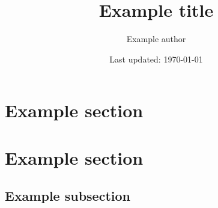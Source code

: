 \documentclass[lang=english]{math-handout}
\title{Example title}
\date{Last updated: \today}
\author{Example author}
\begin{document}
\maketitle

\section{Example section}


\lipsum[1-3]

\section{Example section}

\lipsum[1]

\subsection{Example subsection}

\lipsum

\clearpage
\tableofcontents
\end{document}
